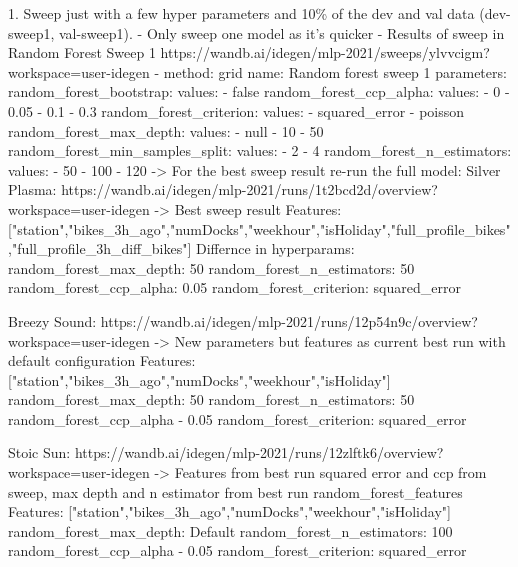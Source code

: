 \documentclass{article}
\begin{document}
{{{{{{        1. Sweep just with a few hyper parameters and 10\% of the dev and val data (dev-sweep1, val-sweep1).
        - Only sweep one model as it's quicker
        - Results of sweep in Random Forest Sweep 1 https://wandb.ai/idegen/mlp-2021/sweeps/ylvvcigm?workspace=user-idegen
        - method: grid
            name: Random forest sweep 1
            parameters:
              random_forest_bootstrap:
                values:
                - false
              random_forest_ccp_alpha:
                values:
                - 0
                - 0.05
                - 0.1
                - 0.3
              random_forest_criterion:
                values:
                - squared_error
                - poisson
              random_forest_max_depth:
                values:
                - null
                - 10
                - 50
              random_forest_min_samples_split:
                values:
                - 2
                - 4
              random_forest_n_estimators:
                values:
                - 50
                - 100
                - 120
        -> For the best sweep result re-run the full model:
        Silver Plasma: https://wandb.ai/idegen/mlp-2021/runs/1t2bcd2d/overview?workspace=user-idegen
        -> Best sweep result
        Features:
        ["station","bikes_3h_ago","numDocks","weekhour","isHoliday","full_profile_bikes","full_profile_3h_diff_bikes"]
        Differnce in hyperparams:
        random_forest_max_depth: 50
        random_forest_n_estimators: 50
        random_forest_ccp_alpha: 0.05
        random_forest_criterion: squared_error

        Breezy Sound: https://wandb.ai/idegen/mlp-2021/runs/12p54n9c/overview?workspace=user-idegen
            -> New parameters but features as current best run with default configuration
            Features: ["station","bikes_3h_ago","numDocks","weekhour","isHoliday"]
            random_forest_max_depth: 50
            random_forest_n_estimators: 50
            random_forest_ccp_alpha - 0.05
            random_forest_criterion: squared_error

        Stoic Sun: https://wandb.ai/idegen/mlp-2021/runs/12zlftk6/overview?workspace=user-idegen
            -> Features from best run squared error and ccp from sweep, max depth and n estimator from best run
            random_forest_features
            Features: ["station","bikes_3h_ago","numDocks","weekhour","isHoliday"]
            random_forest_max_depth: Default
            random_forest_n_estimators: 100
            random_forest_ccp_alpha - 0.05
            random_forest_criterion: squared_error

}}}}}}
\end{document}
